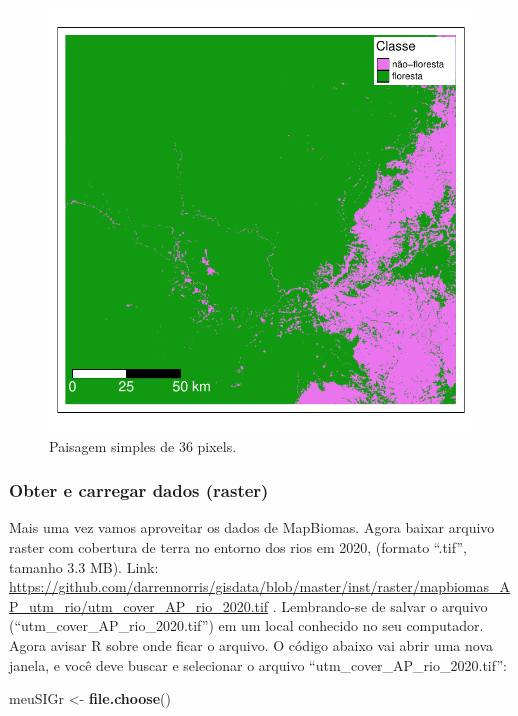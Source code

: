 \documentclass[
]{article}
\newenvironment{Shaded}{\begin{snugshade}}{\end{snugshade}}
\newcommand{\FunctionTok}[1]{\textcolor[rgb]{0.13,0.29,0.53}{\textbf{#1}}}
\newcommand{\NormalTok}[1]{#1}
\newcommand{\OtherTok}[1]{\textcolor[rgb]{0.56,0.35,0.01}{#1}}
\begin{document}
\begin{figure}
\centering
\includegraphics{epr_files/figure-latex/unnamed-chunk-246-1.pdf}
\caption{\label{fig:unnamed-chunk-246}Paisagem simples de 36 pixels.}
\end{figure}

\hypertarget{obter-e-carregar-dados-raster-1}{%
\subsubsection{Obter e carregar dados (raster)}\label{obter-e-carregar-dados-raster-1}}

Mais uma vez vamos aproveitar os dados de MapBiomas. Agora baixar arquivo raster com cobertura de terra no entorno dos rios em 2020, (formato ``.tif'', tamanho 3.3 MB). Link: \url{https://github.com/darrennorris/gisdata/blob/master/inst/raster/mapbiomas_AP_utm_rio/utm_cover_AP_rio_2020.tif} . Lembrando-se de salvar o arquivo (``utm\_cover\_AP\_rio\_2020.tif'') em um local conhecido no seu computador. Agora avisar R sobre onde ficar o arquivo. O código abaixo vai abrir uma nova janela, e você deve buscar e selecionar o arquivo ``utm\_cover\_AP\_rio\_2020.tif'':

\begin{Shaded}
\begin{Highlighting}[]
\NormalTok{meuSIGr }\OtherTok{\textless{}{-}} \FunctionTok{file.choose}\NormalTok{()}
\end{Highlighting}
\end{Shaded}
\end{document}

